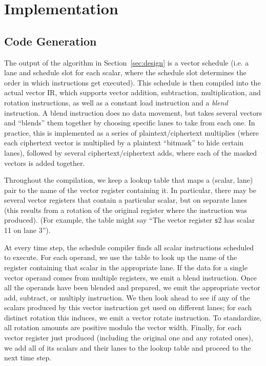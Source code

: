 \section{Implementation}\label{sec:implementation}
\subsection{Code Generation}\label{sec:codegen}
The output of the algorithm in Section~\ref{sec:design} is a vector schedule (i.e. a lane and schedule slot for each scalar, where the schedule slot determines the order in which instructions get executed).
This schedule is then compiled into the actual vector IR, which supports vector addition, subtraction, multiplication, and rotation instructions, as well as a constant load instruction and a {\em blend} instruction.
A blend instruction does no data movement, but takes several vectors and ``blends'' them together by choosing specific lanes to take from each one.
In practice, this is implemented as a series of plaintext/ciphertext multiplies (where each ciphertext vector is multiplied by a plaintext ``bitmask'' to hide certain lanes), followed by several ciphertext/ciphertext adds, where each of the masked vectors is added together.

Throughout the compilation, we keep a lookup table that maps a (scalar, lane) pair to the name of the vector register containing it.
In particular, there may be several vector registers that contain a particular scalar, but on separate lanes (this results from a rotation of the original register where the instruction was produced).
(For example, the table might say ``The vector register {\texttt s2} has scalar 11 on lane 3'').

At every time step, the schedule compiler finds all scalar instructions scheduled to execute.
For each operand, we use the table to look up the name of the register containing that scalar in the appropriate lane.
If the data for a single vector operand comes from multiple registers, we emit a blend instruction.
Once all the operands have been blended and prepared, we emit the appropriate vector add, subtract, or multiply instruction.
We then look ahead to see if any of the scalars produced by this vector instruction get used on different lanes; for each distinct rotation this induces, we emit a vector rotate instruction.
To standardize, all rotation amounts are positive modulo the vector width.
Finally, for each vector register just produced (including the original one and any rotated ones), we add all of its scalars and their lanes to the lookup table and proceed to the next time step.

